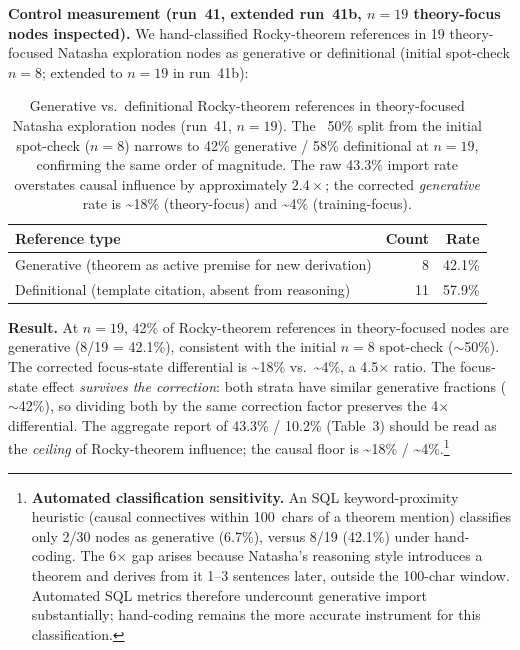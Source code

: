 \documentclass[11pt]{article}
\begin{document}
\textbf{Control measurement (run~41, extended run~41b, $n=19$ theory-focus nodes inspected).}
We hand-classified Rocky-theorem references in 19 theory-focused Natasha exploration
nodes as generative or definitional (initial spot-check $n=8$; extended to $n=19$ in run~41b):

\begin{table}[h]
\centering
\begin{tabular}{lrr}
\toprule
Reference type & Count & Rate \\
\midrule
Generative (theorem as active premise for new derivation) & 8 & 42.1\% \\
Definitional (template citation, absent from reasoning) & 11 & 57.9\% \\
\bottomrule
\end{tabular}
\caption{Generative vs.\ definitional Rocky-theorem references in theory-focused Natasha
exploration nodes (run~41, $n=19$). The ~50\% split from the initial spot-check ($n=8$) narrows to 42\% generative / 58\% definitional at $n=19$, confirming the same order of magnitude.
The raw 43.3\% import rate overstates causal influence by approximately $2.4\times$; the corrected \emph{generative} rate is
\textasciitilde18\% (theory-focus) and \textasciitilde4\% (training-focus).}
\end{table}

\textbf{Result.} At $n=19$, 42\% of Rocky-theorem references in theory-focused nodes are generative
(8/19 = 42.1\%), consistent with the initial $n=8$ spot-check ($\sim$50\%). The corrected focus-state differential is
\textasciitilde18\% vs.\ \textasciitilde4\%, a 4.5$\times$ ratio. The focus-state effect \emph{survives the correction}:
both strata have similar generative fractions ($\sim$42\%), so dividing both
by the same correction factor preserves the 4$\times$ differential. The aggregate report of
43.3\% / 10.2\% (Table~3) should be read as the \emph{ceiling} of Rocky-theorem influence;
the causal floor is \textasciitilde18\% / \textasciitilde4\%.\footnote{\textbf{Automated classification sensitivity.}
An SQL keyword-proximity heuristic (causal connectives within 100~chars of a theorem mention) classifies only 2/30 nodes as generative (6.7\%), versus 8/19 (42.1\%) under hand-coding.
The 6$\times$ gap arises because Natasha's reasoning style introduces a theorem and derives from it 1--3 sentences later, outside the 100-char window.
Automated SQL metrics therefore undercount generative import substantially; hand-coding remains the more accurate instrument for this classification.}
\end{document}
